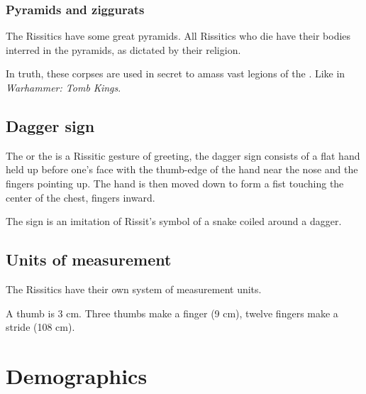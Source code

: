 \subsubsection{Pyramids and ziggurats}
The Rissitics have some great pyramids. All Rissitics who die have their bodies interred in the pyramids, as dictated by their religion. 

In truth, these corpses are used in secret to amass vast legions of the . Like in \emph{Warhammer: Tomb Kings}. 









\subsection{Dagger sign}
The  or the  is a Rissitic gesture of greeting, the dagger sign consists of a flat hand held up before one's face with the thumb-edge of the hand near the nose and the fingers pointing up. The hand is then moved down to form a fist touching the center of the chest, fingers inward. 

The sign is an imitation of Rissit's symbol of a snake coiled around a dagger. 






\subsection{Units of measurement}
The Rissitics have their own system of measurement units. 

A thumb is 3 cm. Three thumbs make a finger (9 cm), twelve fingers make a stride (108 cm).















\section{Demographics}


